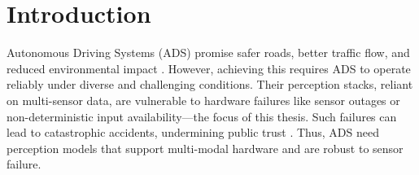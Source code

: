 \section{Introduction} \label{Introduction}


Autonomous Driving Systems (ADS) promise safer roads, better traffic flow, and reduced environmental impact \cite{litmanAutonomousVehicleImplementationb}. However, achieving this requires ADS to operate reliably under diverse and challenging conditions. Their perception stacks, reliant on multi-sensor data, are vulnerable to hardware failures like sensor outages or non-deterministic input availability—the focus of this thesis. Such failures can lead to catastrophic accidents, undermining public trust \cite{yurtseverSurveyAutonomousDriving2020}. Thus, ADS need perception models that support multi-modal hardware and are robust to sensor failure.

